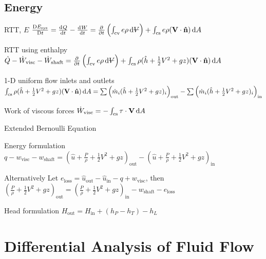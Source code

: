 \documentclass{article}
\begin{document}
\subsection{Energy}
\begin{description*}
\item[RTT, $E$]
  \(\frac{\Dif E_\mathrm{sys}}{\Dif t}
  = \od{Q}{t}-\od{W}{t}
  = \pd{}{t}\left(\int_\mathrm{cv}e\rho\dif{\volsym}\right)
  + \int_\mathrm{cs}e\rho(\vec{V}\cdot\uvec{n})\dif{A}\)
\item[RTT using enthalpy]
  \(\dot{Q}-\dot{W}_\mathrm{visc}-\dot{W}_\mathrm{shaft}
  = \pd{}{t}\left(\int_\mathrm{cv}e\rho\dif{\volsym}\right)
  + \int_\mathrm{cs}\rho(\hat{h}+\frac{1}{2}V^2+gz)(\vec{V}\cdot\uvec{n})\dif{A}\)
\item[1-D uniform flow inlets and outlets]~\\
  \(\int_\mathrm{cs}\rho(\hat{h}+\frac{1}{2}V^2+gz)(\vec{V}\cdot\uvec{n})\dif{A}
  = \sum\left(\dot{m}_i(\hat{h}+\frac{1}{2}V^2+gz)_i\right)_\mathrm{out}
  - \sum\left(\dot{m}_i(\hat{h}+\frac{1}{2}V^2+gz)_i\right)_\mathrm{in}\)
\item[Work of viscous forces]
  \(\dot{W}_\mathrm{visc} = -\int_\mathrm{cs}\vec\tau\cdot\vec{V}\dif{A}\)
\item[Extended Bernoulli Equation]~
  \begin{description*}
  \item[Energy formulation]
    \(q - w_\mathrm{visc} - w_\mathrm{shaft}
    = \left(\hat{u}+\frac{P}{\rho}+\frac{1}{2}V^2+gz\right)_\mathrm{out}
    - \left(\hat{u}+\frac{P}{\rho}+\frac{1}{2}V^2+gz\right)_\mathrm{in}\)
  \item[Alternatively]
    Let \(e_\mathrm{loss} = \hat{u}_\mathrm{out}-\hat{u}_\mathrm{in}-q+w_\mathrm{visc}\), then \\
    \(\left(\frac{P}{\rho}+\frac{1}{2}V^2+gz\right)_\mathrm{out}
    = \left(\frac{P}{\rho}+\frac{1}{2}V^2+gz\right)_\mathrm{in}
    - w_\mathrm{shaft} - e_\mathrm{loss}\)
  \item[Head formulation]
    \(H_\mathrm{out} = H_\mathrm{in} + (h_P-h_T) - h_L\)
  \end{description*}
\end{description*}

\section{Differential Analysis of Fluid Flow}
\end{document}
